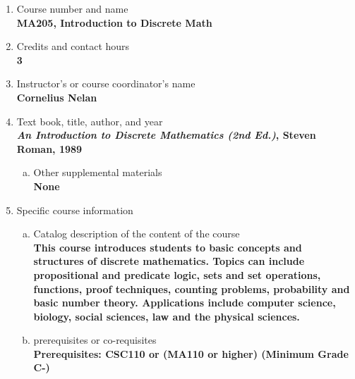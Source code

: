 \label{MA205}  %
\begin{enumerate}[1.]
\item Course number and name\\
  {\bfseries
    MA205, Introduction to Discrete Math
  }
  
\item Credits and contact hours\\
  {\bfseries
    3  %
  }

\item Instructor's or course coordinator's name\\
  {\bfseries
    Cornelius Nelan
  }

\item Text book, title, author, and year\\
  {\bfseries
    {\em An Introduction to Discrete Mathematics (2nd Ed.)}, Steven Roman, 1989
  }
\begin{enumerate}[a.]
\item Other supplemental materials\\
  {\bfseries
    None    
  }
\end{enumerate}

\item Specific course information
\begin{enumerate}[a.]  
\item Catalog description of the content of the course\\
  {\bfseries
This course introduces students to basic concepts and structures of discrete mathematics. Topics can include propositional and predicate logic, sets and set operations, functions, proof techniques, counting problems, probability and basic number theory. Applications include computer science, biology, social sciences, law and the physical sciences.    
  }

\item prerequisites or co-requisites\\
  {\bfseries
    Prerequisites: CSC110 or (MA110 or higher) (Minimum Grade C-) %
  }


\end{enumerate}
\end{enumerate}

